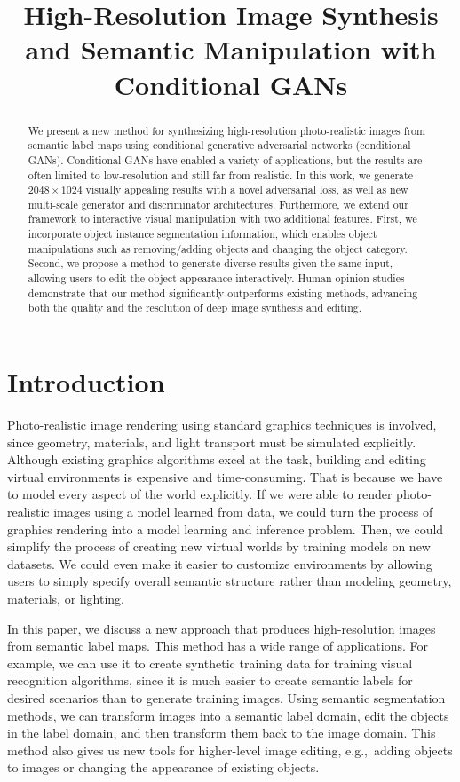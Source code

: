 \title{High-Resolution Image Synthesis and Semantic Manipulation with Conditional GANs}

\begin{abstract}
We present a new method for synthesizing high-resolution photo-realistic images from semantic label maps using conditional generative adversarial networks (conditional GANs). Conditional GANs have enabled a variety of applications, but the results are often limited to low-resolution and still far from realistic. In this work, we generate $2048\times1024$ visually appealing results with a novel adversarial loss, as well as new multi-scale generator and discriminator architectures. Furthermore, we extend our framework to interactive visual manipulation with two additional features. First, we incorporate object instance segmentation information, which enables object manipulations such as removing/adding objects and changing the object category. Second, we propose a method to generate diverse results given the same input, allowing users to edit the object appearance interactively. Human opinion studies demonstrate that our method significantly outperforms existing methods, advancing both the quality and the resolution of deep image synthesis and editing.
\end{abstract}

\section{Introduction} \label{sec:intro}

Photo-realistic image rendering using standard graphics techniques is involved, since geometry, materials, and light transport must be simulated explicitly. Although existing graphics algorithms excel at the task, building and editing virtual environments is expensive and time-consuming. That is because we have to model every aspect of the world explicitly. If we were able to render photo-realistic images using a model learned from data, we could turn the process of graphics rendering into a model learning and inference problem. Then, we could simplify the process of creating new virtual worlds by training models on new datasets. We could even make it easier to customize environments by allowing users to simply specify overall semantic structure rather than modeling geometry, materials, or lighting. 

In this paper, we discuss a new approach that produces high-resolution images from semantic label maps. This method has a wide range of applications. For example, we can use it to create synthetic training data for training visual recognition algorithms, since it is much easier to create semantic labels for desired scenarios than to generate training images. Using semantic segmentation methods, we can transform images into a semantic label domain, edit the objects in the label domain, and then transform them back to the image domain. This method also gives us new tools for higher-level image editing, e.g.,\ adding objects to images or changing the appearance of existing objects.

